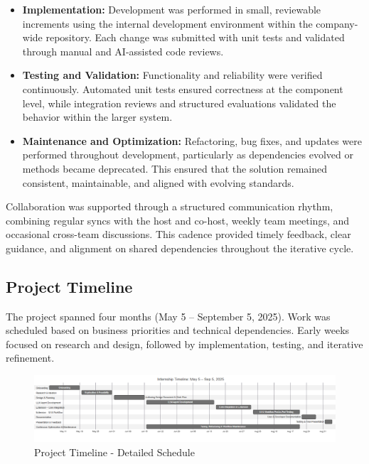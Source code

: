 \begin{spacing}{1.2}
\begin{itemize}
    \item \textbf{Implementation:} Development was performed in small, reviewable increments using the internal development environment within the company-wide repository. Each change was submitted with unit tests and validated through manual and AI-assisted code reviews.

    \item \textbf{Testing and Validation:} Functionality and reliability were verified continuously. Automated unit tests ensured correctness at the component level, while integration reviews and structured evaluations validated the behavior within the larger system.

    \item \textbf{Maintenance and Optimization:} Refactoring, bug fixes, and updates were performed throughout development, particularly as dependencies evolved or methods became deprecated. This ensured that the solution remained consistent, maintainable, and aligned with evolving standards.
\end{itemize}

Collaboration was supported through a structured communication rhythm, combining regular syncs with the host and co-host, weekly team meetings, and occasional cross-team discussions. This cadence provided timely feedback, clear guidance, and alignment on shared dependencies throughout the iterative cycle.


\subsection{Project Timeline}
The project spanned four months (May 5 – September 5, 2025). Work was scheduled based on business priorities and technical dependencies. Early weeks focused on research and design, followed by implementation, testing, and iterative refinement.

\newpage
\begin{landscape}
\vspace*{\fill}
\begin{figure}[!ht]
    \centering
    \includegraphics[width=1.3\textwidth,height=0.9\textheight,keepaspectratio]{Images/project_timeline.png}
    \caption{Project Timeline - Detailed Schedule}
    \label{fig:project_timeline}
\end{figure}
\vspace*{\fill}
\end{landscape}
\newpage



\end{spacing}
